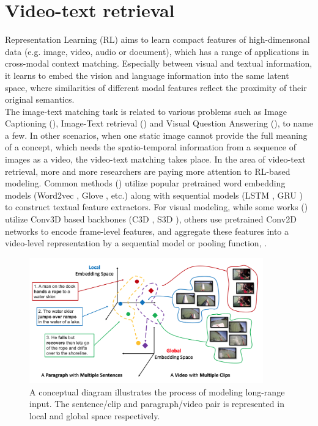 \section{Video-text retrieval}
\label{sec:video-text_ret}
Representation Learning (RL) aims to learn compact features of high-dimensonal data (e.g. image, video, audio or document), which has a range of applications in cross-modal context matching. Especially between visual and textual information, it learns to embed the vision and language information into the same latent space, where similarities of different modal features reflect the proximity of their original semantics. \\
The image-text matching task is related to various problems such as Image Captioning (\cite{vinyals2015show, xu2015show, anderson2018bottom}), Image-Text retrieval (\cite{radenovic2018fine, vo2019composing, revaud2019learning}) and Visual Question Answering (\cite{xu2016ask, goyal2017making, anderson2018bottom}), to name a few.
In other scenarios, when one static image cannot provide the full meaning of a concept, which needs the spatio-temporal information from a sequence of images as a video, the video-text matching takes place. 
In the area of video-text retrieval, more and more researchers are paying more attention to RL-based modeling.
Common methods (\cite{lin2014visual, yu2017end, mithun2018learning, miech2018learning, dong2019dual}) utilize popular pretrained word embedding models (Word2vec \cite{mikolov2013efficient}, Glove \cite{pennington2014glove}, etc.) along with sequential models (LSTM \cite{hochreiter1997long}, GRU \cite{cho2014learning}) to construct textual feature extractors. For visual modeling, while some works (\cite{zhang2018cross, miech2020end}) utilize Conv3D based backbones (C3D \cite{carreira2017quo}, S3D \cite{xie2018rethinking}), others use pretrained Conv2D networks to encode frame-level features, and aggregate these features into a video-level representation by a sequential model or pooling function, \cite{li2019w2vv++,ging2020coot}. 
\begin{figure}[t!]
    \centering
    \includegraphics[width=0.9\textwidth]{images/long_vid-text.png}
    \caption{A conceptual diagram illustrates the process of modeling long-range input. The sentence/clip and paragraph/video pair is represented in local and global space respectively. \cite{zhang2018cross}}
    \label{fig:long_vidtext}
\end{figure}
